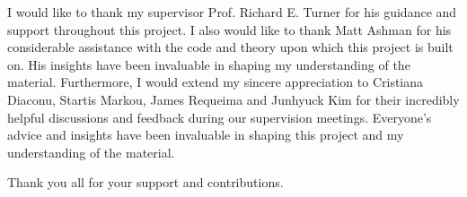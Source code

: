 \documentclass[../../main.tex]{subfiles}
\begin{document}

I would like to thank my supervisor Prof. Richard E. Turner for his guidance and support throughout this project. I also would like to thank Matt Ashman for his considerable assistance with the code and theory upon which this project is built on. His insights have been invaluable in shaping my understanding of the material. Furthermore, I would extend my sincere appreciation to Cristiana Diaconu, Startis Markou, James Requeima and Junhyuck Kim for their incredibly helpful discussions and feedback during our supervision meetings. Everyone's advice and insights have been invaluable in shaping this project and my understanding of the material.

Thank you all for your support and contributions.

\ifSubfilesClassLoaded{%
    \printbibliography{}
}{} 
\end{document}
